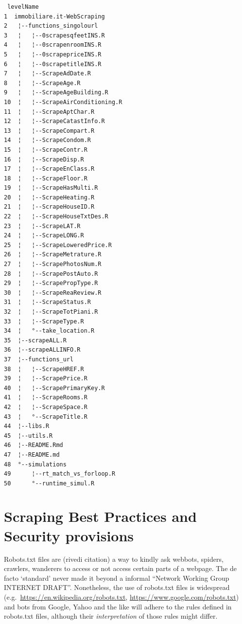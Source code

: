 \documentclass[
  12pt,
  a4paper,
  oneside]{book}
\theoremstyle{definition}
\theoremstyle{definition}
\theoremstyle{definition}
\theoremstyle{remark}
\begin{document}
\begin{verbatim}
 levelName
1  immobiliare.it-WebScraping     
2   ¦--functions_singolourl       
3   ¦   ¦--0scrapesqfeetINS.R     
4   ¦   ¦--0scrapenroomINS.R      
5   ¦   ¦--0scrapepriceINS.R      
6   ¦   ¦--0scrapetitleINS.R      
7   ¦   ¦--ScrapeAdDate.R         
8   ¦   ¦--ScrapeAge.R            
9   ¦   ¦--ScrapeAgeBuilding.R    
10  ¦   ¦--ScrapeAirConditioning.R
11  ¦   ¦--ScrapeAptChar.R        
12  ¦   ¦--ScrapeCatastInfo.R     
13  ¦   ¦--ScrapeCompart.R        
14  ¦   ¦--ScrapeCondom.R         
15  ¦   ¦--ScrapeContr.R          
16  ¦   ¦--ScrapeDisp.R           
17  ¦   ¦--ScrapeEnClass.R        
18  ¦   ¦--ScrapeFloor.R          
19  ¦   ¦--ScrapeHasMulti.R       
20  ¦   ¦--ScrapeHeating.R        
21  ¦   ¦--ScrapeHouseID.R        
22  ¦   ¦--ScrapeHouseTxtDes.R    
23  ¦   ¦--ScrapeLAT.R            
24  ¦   ¦--ScrapeLONG.R           
25  ¦   ¦--ScrapeLoweredPrice.R   
26  ¦   ¦--ScrapeMetrature.R      
27  ¦   ¦--ScrapePhotosNum.R      
28  ¦   ¦--ScrapePostAuto.R       
29  ¦   ¦--ScrapePropType.R       
30  ¦   ¦--ScrapeReaReview.R      
31  ¦   ¦--ScrapeStatus.R         
32  ¦   ¦--ScrapeTotPiani.R       
33  ¦   ¦--ScrapeType.R           
34  ¦   °--take_location.R        
35  ¦--scrapeALL.R                
36  ¦--scrapeALLINFO.R            
37  ¦--functions_url              
38  ¦   ¦--ScrapeHREF.R           
39  ¦   ¦--ScrapePrice.R          
40  ¦   ¦--ScrapePrimaryKey.R     
41  ¦   ¦--ScrapeRooms.R          
42  ¦   ¦--ScrapeSpace.R          
43  ¦   °--ScrapeTitle.R          
44  ¦--libs.R                     
45  ¦--utils.R                    
46  ¦--README.Rmd                 
47  ¦--README.md                  
48  °--simulations                
49      ¦--rt_match_vs_forloop.R  
50      °--runtime_simul.R
\end{verbatim}

\hypertarget{best-practices}{%
\section{Scraping Best Practices and Security provisions}\label{best-practices}}

Robots.txt files are (rivedi citation) a way to kindly ask webbots, spiders, crawlers, wanderers to access or not access certain parts of a webpage. The de facto `standard' never made it beyond a informal ``Network Working Group INTERNET DRAFT''. Nonetheless, the use of robots.txt files is widespread (e.g.~\url{https://en.wikipedia.org/robots.txt}, \url{https://www.google.com/robots.txt}) and bots from Google, Yahoo and the like will adhere to the rules defined in robots.txt files, although their \emph{interpretation} of those rules might differ.
\end{document}
